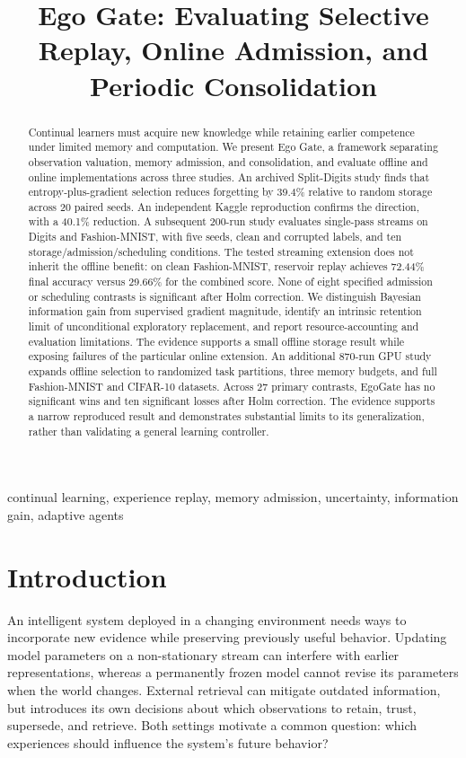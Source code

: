 \documentclass[conference]{IEEEtran}
\title{Ego Gate: Evaluating Selective Replay, Online Admission, and Periodic Consolidation}
\author{\IEEEauthorblockN{Aditya Singh}}
\begin{document}
\maketitle

\begin{abstract}
Continual learners must acquire new knowledge while retaining earlier competence under limited memory and computation. We present Ego Gate, a framework separating observation valuation, memory admission, and consolidation, and evaluate offline and online implementations across three studies. An archived Split-Digits study finds that entropy-plus-gradient selection reduces forgetting by 39.4\% relative to random storage across 20 paired seeds. An independent Kaggle reproduction confirms the direction, with a 40.1\% reduction. A subsequent 200-run study evaluates single-pass streams on Digits and Fashion-MNIST, with five seeds, clean and corrupted labels, and ten storage/admission/scheduling conditions. The tested streaming extension does not inherit the offline benefit: on clean Fashion-MNIST, reservoir replay achieves 72.44\% final accuracy versus 29.66\% for the combined score. None of eight specified admission or scheduling contrasts is significant after Holm correction. We distinguish Bayesian information gain from supervised gradient magnitude, identify an intrinsic retention limit of unconditional exploratory replacement, and report resource-accounting and evaluation limitations. The evidence supports a small offline storage result while exposing failures of the particular online extension. An additional 870-run GPU study expands offline selection to randomized task partitions, three memory budgets, and full Fashion-MNIST and CIFAR-10 datasets. Across 27 primary contrasts, EgoGate has no significant wins and ten significant losses after Holm correction. The evidence supports a narrow reproduced result and demonstrates substantial limits to its generalization, rather than validating a general learning controller.
\end{abstract}
\begin{IEEEkeywords}
continual learning, experience replay, memory admission, uncertainty, information gain, adaptive agents
\end{IEEEkeywords}

\section{Introduction}
An intelligent system deployed in a changing environment needs ways to incorporate new evidence while preserving previously useful behavior. Updating model parameters on a non-stationary stream can interfere with earlier representations, whereas a permanently frozen model cannot revise its parameters when the world changes. External retrieval can mitigate outdated information, but introduces its own decisions about which observations to retain, trust, supersede, and retrieve. Both settings motivate a common question: which experiences should influence the system's future behavior?
\end{document}

